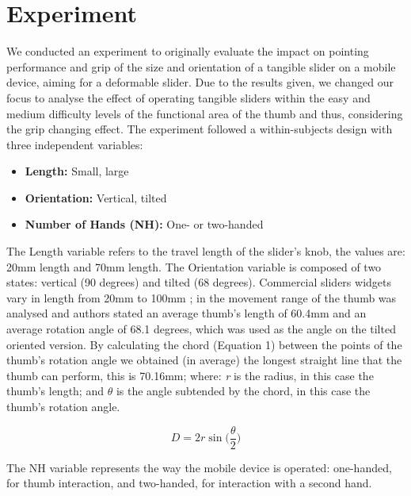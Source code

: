 \documentclass{sigchi}
\begin{document}
\section{Experiment}
We conducted an experiment to originally evaluate the impact on pointing performance and grip of the size and orientation of a tangible slider on a mobile device, aiming for a deformable slider. Due to the results given, we changed our focus to analyse the effect of operating tangible sliders within the easy and medium difficulty levels of the functional area of the thumb and thus, considering the grip changing effect. The experiment followed a within-subjects design with three independent variables:

\begin{itemize}
\item \textbf{Length:} Small, large
\item \textbf{Orientation:} Vertical, tilted
\item \textbf{Number of Hands (NH):} One- or two-handed
\end{itemize}

The Length variable refers to the travel length of the slider’s knob, the values are: 20mm length and 70mm length. The Orientation variable is composed of two states: vertical (90 degrees) and tilted (68 degrees). Commercial sliders widgets vary in length from 20mm to 100mm \cite{Coutrix2015}; in \cite{Hirotaka:2003:RCC:765891.766081} the movement range of the thumb was analysed and authors stated an average thumb’s length of 60.4mm and an average rotation angle of 68.1 degrees, which was used as the angle on the tilted oriented version. By calculating the chord (Equation 1) between the points of the thumb’s rotation angle we obtained (in average) the longest straight line that the thumb can perform, this is 70.16mm; where: \textit{r} is the radius, in this case the thumb’s length; and $\theta$ is the angle subtended by the chord, in this case the thumb’s rotation angle.

\begin{equation}
D=2r\sin\Big(\frac{\theta}{2}\Big)
\end{equation}

The NH variable represents the way the mobile device is operated: one-handed, for thumb interaction, and two-handed, for interaction with a second hand.
\end{document}
